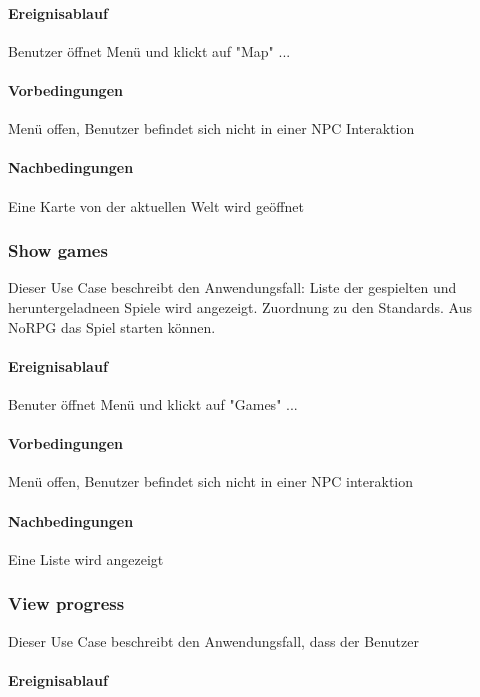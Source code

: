 			\paragraph{Ereignisablauf}
			Benutzer öffnet Menü und klickt auf "Map" ...
	
			\paragraph{Vorbedingungen}
				Menü offen, Benutzer befindet sich nicht in einer NPC Interaktion
			
			\paragraph{Nachbedingungen}
				Eine Karte von der aktuellen Welt wird geöffnet
	
		\subsubsection{Show games}
			Dieser Use Case beschreibt den Anwendungsfall: Liste der gespielten und heruntergeladneen Spiele wird angezeigt. Zuordnung zu den Standards. Aus NoRPG das Spiel starten können.
			
			\paragraph{Ereignisablauf}
				Benuter öffnet Menü und klickt auf "Games" ...

			\paragraph{Vorbedingungen}
				Menü offen, Benutzer befindet sich nicht in einer NPC interaktion
			
			\paragraph{Nachbedingungen}
				Eine Liste wird angezeigt
	
		\subsubsection{View progress}
			Dieser Use Case beschreibt den Anwendungsfall, dass der Benutzer 
			
			\paragraph{Ereignisablauf}
	
